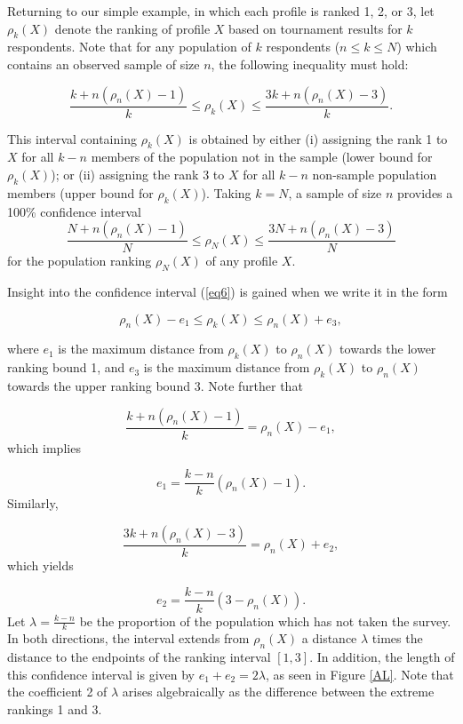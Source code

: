 \documentclass[a4paper, 12pt]{article}
\begin{document}
Returning to our simple example, in which each profile is ranked 1, 2, or 3, let $\rho_k(X)$ denote the ranking of profile $X$ based on tournament results for $k$ respondents. Note that for any population of $k$ respondents ($n\le k \le N$) which contains an observed sample of size $n$, the following inequality must hold:

\begin{equation}
\frac{k+n(\rho_n(X)-1)}{k}\le \rho_k(X)  \le \frac{3k+n(\rho_n(X)-3)}{k}.
\label{eq6}
\end{equation}

{\flushleft This} interval containing $\rho_k(X) $ is obtained by either (i) assigning the  rank 1 to $X$ for all $k-n$ members of the population not in the sample (lower bound for $\rho_k(X)$); or (ii) assigning the rank 3 to $X$  for all $k-n$ non-sample population members (upper bound for $\rho_k(X)$). Taking $k=N$, a sample of size $n$ provides  a 100\% confidence interval $$\frac{N+n(\rho_n(X)-1)}{N}\le \rho_N(X)  \le \frac{3N+n(\rho_n(X)-3)}{N}$$ for the population ranking $\rho_N(X)$ of any profile $X$.

Insight into the confidence interval (\ref{eq6}) is gained when we write it in the form

\begin{equation}
\rho_n(X)-e_1 \le \rho_k(X) \le \rho_n(X)+e_3,
\end{equation}
\label{eq:9}

{\flushleft where} $e_1$ is the maximum distance from $\rho_k(X)$ to $\rho_n(X)$ towards the lower ranking bound 1, and $e_3$ is the maximum distance  from $\rho_k(X)$ to $\rho_n(X)$ towards the upper ranking bound 3. Note further that


\begin{equation}
\frac{k+n(\rho_n(X)-1)}{k} = \rho_n(X)-e_1,
\end{equation}
\label{eq:10}
{\flushleft which implies}

\begin{equation}
e_1 = \frac{k-n}{k}(\rho_n(X)-1).
\end{equation}
\label{eq:11}
{\flushleft Similarly,}

\begin{equation}
\frac{3k+n(\rho_n(X)-3)}{k} = \rho_n(X)+e_2,
\end{equation}
\label{eq:12}
{\flushleft which} yields

\begin{equation}
e_2=\frac{k-n}{k}(3-\rho_n(X)).
\end{equation}
\label{eq:13}
{\flushleft Let} $\lambda=\frac{k-n}{k}$ be the proportion of the population which has not taken the survey. In both directions, the interval extends from $\rho_n(X)$ a distance $\lambda$ times the distance to the endpoints of the ranking interval $[1, 3]$. In addition, the length of this confidence interval is given by  $e_1+e_2=2\lambda$, as seen in Figure \ref{AL}. Note that the coefficient 2 of $\lambda$ arises algebraically as the difference between  the extreme rankings 1 and 3.
\end{document}
